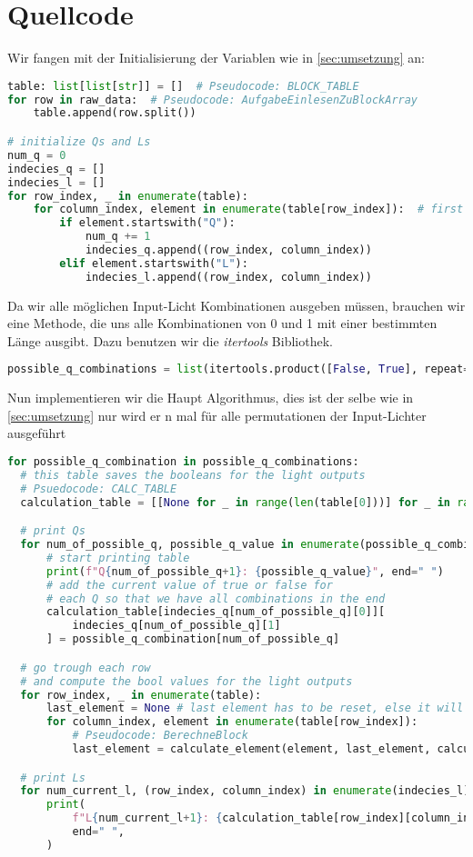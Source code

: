 \documentclass[a4paper,10pt,ngerman]{scrartcl}
\begin{document}
\section{Quellcode}
\label{Quellcode}\label{sec:quellcode}
Wir fangen mit der Initialisierung der Variablen wie in \cref{sec:umsetzung} an:
\begin{lstlisting}[language=Python]
table: list[list[str]] = []  # Pseudocode: BLOCK_TABLE
for row in raw_data:  # Pseudocode: AufgabeEinlesenZuBlockArray
    table.append(row.split())

# initialize Qs and Ls
num_q = 0
indecies_q = []
indecies_l = []
for row_index, _ in enumerate(table):
    for column_index, element in enumerate(table[row_index]):  # first row
        if element.startswith("Q"):
            num_q += 1
            indecies_q.append((row_index, column_index))
        elif element.startswith("L"):
            indecies_l.append((row_index, column_index))
\end{lstlisting}
Da wir alle möglichen Input-Licht Kombinationen ausgeben müssen, brauchen wir eine Methode, die uns alle Kombinationen von 0 und 1 mit einer bestimmten Länge ausgibt. Dazu benutzen wir die \emph{itertools} Bibliothek.
\begin{lstlisting}[language=Python]
possible_q_combinations = list(itertools.product([False, True], repeat=num_q))
\end{lstlisting}
Nun implementieren wir die Haupt Algorithmus, dies ist der selbe wie in \cref{sec:umsetzung} nur wird er n mal für alle permutationen der Input-Lichter ausgeführt
\begin{lstlisting}[language=Python]
for possible_q_combination in possible_q_combinations:
  # this table saves the booleans for the light outputs
  # Psuedocode: CALC_TABLE
  calculation_table = [[None for _ in range(len(table[0]))] for _ in range(len(table))]

  # print Qs
  for num_of_possible_q, possible_q_value in enumerate(possible_q_combination):
      # start printing table
      print(f"Q{num_of_possible_q+1}: {possible_q_value}", end=" ")
      # add the current value of true or false for
      # each Q so that we have all combinations in the end
      calculation_table[indecies_q[num_of_possible_q][0]][
          indecies_q[num_of_possible_q][1]
      ] = possible_q_combination[num_of_possible_q]

  # go trough each row
  # and compute the bool values for the light outputs
  for row_index, _ in enumerate(table):
      last_element = None # last element has to be reset, else it will think that blocks on the edge span over 2 rows
      for column_index, element in enumerate(table[row_index]):
          # Pseudocode: BerechneBlock
          last_element = calculate_element(element, last_element, calculation_table, row_index, column_index)

  # print Ls
  for num_current_l, (row_index, column_index) in enumerate(indecies_l):
      print(
          f"L{num_current_l+1}: {calculation_table[row_index][column_index]}",
          end=" ",
      )

\end{lstlisting}
\end{document}
